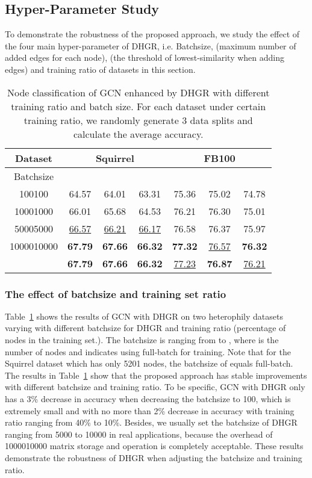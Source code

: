 \documentclass[sigconf]{acmart}
\begin{document}
	\subsection{Hyper-Parameter Study}
	To demonstrate the robustness of the proposed approach, we study the effect of the four main hyper-parameter of DHGR, i.e. Batchsize,    (maximum number of added edges for each node),  (the threshold of lowest-similarity when adding edges) and training ratio of datasets in this section.
	\begin{table}
\centering
		\setlength{\tabcolsep}{5.0pt}
		\caption{Node classification of GCN enhanced by DHGR with different training ratio and batch size. For each dataset under certain training ratio, we randomly generate 3 data splits and calculate the average accuracy. }
		\label{tab:res_bs}
		\begin{tabular}{ccccccc}
			\toprule
Dataset & \multicolumn{3}{c}{Squirrel} & \multicolumn{3}{c}{FB100}  \\
			\midrule
			Batchsize &&& &&& \\
			\midrule
			100100 & 64.57 & 64.01 & 63.31 & 75.36 & 75.02 & 74.78  \\
			10001000 & 66.01 & 65.68 & 64.53  & 76.21 & 76.30 & 75.01  \\
			50005000 & \underline{66.57} & \underline{66.21} & \underline{66.17} & 76.58 & 76.37 & 75.97  \\
			1000010000 & \textbf{67.79} & \textbf{67.66} & \textbf{66.32} &\textbf{ 77.32} & \underline{76.57} & \textbf{76.32}   \\
			 & \textbf{67.79} & \textbf{67.66} & \textbf{66.32}  & \underline{77.23} & \textbf{76.87} & \underline{76.21 } \\
			\bottomrule
		\end{tabular}
		
	\end{table}
	\subsubsection{The effect of batchsize and training set ratio}
	Table~\ref{tab:res_bs} shows the results of GCN with DHGR on two heterophily datasets varying with different batchsize for DHGR and training ratio (percentage of nodes in the training set.). The batchsize is ranging from  to , where  is the number of nodes and  indicates using full-batch for training. Note that for the Squirrel dataset which has only 5201 nodes, the batchsize of  equals full-batch. The results in Table~\ref{tab:res_bs} show that the proposed approach has stable improvements with different batchsize and training ratio. To be specific, GCN with DHGR only has a 3\% decrease in accuracy when decreasing the batchsize to 100, which is extremely small and with no more than 2\% decrease in accuracy with training ratio ranging from 40\% to 10\%. Besides, we usually set the batchsize of DHGR ranging from 5000 to 10000 in real applications, because the overhead of 1000010000 matrix storage and operation is completely acceptable. These results demonstrate the robustness of DHGR when adjusting the batchsize and training ratio.
	
\end{document}

